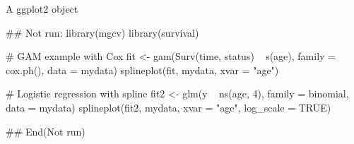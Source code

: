 \documentclass[letterpaper]{book}
\begin{document}
%
\begin{Value}
A ggplot2 object
\end{Value}
%
\begin{Examples}
\begin{ExampleCode}
## Not run: 
library(mgcv)
library(survival)

# GAM example with Cox
fit <- gam(Surv(time, status) ~ s(age), family = cox.ph(), data = mydata)
splineplot(fit, mydata, xvar = "age")

# Logistic regression with spline
fit2 <- glm(y ~ ns(age, 4), family = binomial, data = mydata)
splineplot(fit2, mydata, xvar = "age", log_scale = TRUE)

## End(Not run)
\end{ExampleCode}
\end{Examples}
\printindex{}
\end{document}
